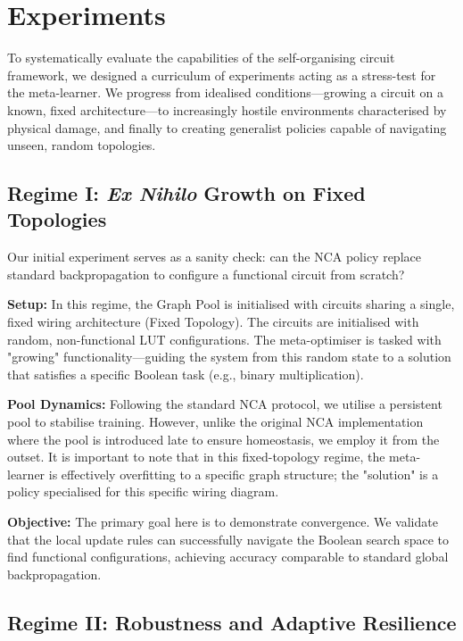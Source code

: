 \section{Experiments}
\label{sec:experiments}

To systematically evaluate the capabilities of the self-organising circuit framework, we designed a curriculum of experiments acting as a stress-test for the meta-learner. We progress from idealised conditions—growing a circuit on a known, fixed architecture—to increasingly hostile environments characterised by physical damage, and finally to creating generalist policies capable of navigating unseen, random topologies.

\subsection{Regime I: \textit{Ex Nihilo} Growth on Fixed Topologies}
\label{subsec:fixed_growth}

Our initial experiment serves as a sanity check: can the NCA policy replace standard backpropagation to configure a functional circuit from scratch?

\textbf{Setup:}
In this regime, the Graph Pool is initialised with circuits sharing a single, fixed wiring architecture (Fixed Topology). The circuits are initialised with random, non-functional LUT configurations. The meta-optimiser is tasked with "growing" functionality—guiding the system from this random state to a solution that satisfies a specific Boolean task (e.g., binary multiplication).

\textbf{Pool Dynamics:}
Following the standard NCA protocol, we utilise a persistent pool to stabilise training. However, unlike the original NCA implementation where the pool is introduced late to ensure homeostasis, we employ it from the outset. It is important to note that in this fixed-topology regime, the meta-learner is effectively overfitting to a specific graph structure; the "solution" is a policy specialised for this specific wiring diagram.

\textbf{Objective:}
The primary goal here is to demonstrate convergence. We validate that the local update rules can successfully navigate the Boolean search space to find functional configurations, achieving accuracy comparable to standard global backpropagation.

\subsection{Regime II: Robustness and Adaptive Resilience}
\label{subsec:robustness}

